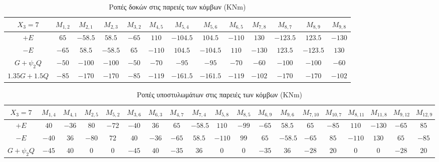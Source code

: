 \begin{landscape}

\begin{table}[h]
\centering\footnotesize
\begin{tabular}{| c || c | c | c | c | c | c | c | c | c | c | c | c |}
\hline
$X_3 = 7$ & $M_{1,2}$ & $M_{2,1}$ & $M_{2,3}$ & $M_{3,2}$ & $M_{4,5}$ & $M_{5,4}$ & $M_{5,6}$ & $M_{6,5}$ & $M_{7,8}$ & $M_{8,7}$ & $M_{8,9}$ & $M_{9,8}$ \\
\hline
\hline
$+E$ & $65$ & $-58.5$ & $58.5$ & $-65$ & $110$ & $-104.5$ & $104.5$ & $-110$ & $130$ & $-123.5$ & $123.5$ & $-130$ \\
\hline
$-E$ & $-65$ & $58.5$ & $-58.5$ & $65$ & $-110$ & $104.5$ & $-104.5$ & $110$ & $-130$ & $123.5$ & $-123.5$ & $130$ \\
\hline
$G+\psi_2 Q$ & $-50$ & $-100$ & $-100$ & $-50$ & $-70$ & $-95$ & $-95$ & $-70$ & $-60$ & $-100$ & $-100$ & $-60$ \\
\hline
$1.35G+1.5Q$ & $-85$ & $-170$ & $-170$ & $-85$ & $-119$ & $-161.5$ & $-161.5$ & $-119$ & $-102$ & $-170$ & $-170$ & $-102$ \\
\hline
\end{tabular}
\caption{Ροπές δοκών στις παρειές των κόμβων (\textlatin{KNm})}
\label{tab:momentbeams}
\end{table}

\begin{table}[h]
\centering\footnotesize
\begin{tabular}{| c || c | c | c | c | c | c | c | c | c | c | c | c | c | c | c | c | c | c |}
\hline
$X_3 = 7$ & $M_{1,4}$ & $M_{4,1}$ & $M_{2,5}$ & $M_{5,2}$ & $M_{3,6}$ & $M_{6,3}$ & $M_{4,7}$ & $M_{7,4}$ & $M_{5,8}$ & $M_{8,5}$ & $M_{6,9}$ & $M_{9,6}$ & $M_{7,10}$ & $M_{10,7}$ & $M_{8,11}$ & $M_{11,8}$ & $M_{9,12}$ & $M_{12,9}$ \\
\hline
\hline
$+E$ & $40$ & $-36$ & $80$ & $-72$ & $-40$ & $36$ & $65$ & $-58.5$ & $110$ & $-99$ & $-65$ & $58.5$ & $65$ & $-85$ & $110$ & $-130$ & $-65$ & $85$ \\
\hline
$-E$ & $-40$ & $36$ & $-80$ & $72$ & $40$ & $-36$ & $-65$ & $58.5$ & $-110$ & $99$ & $65$ & $-58.5$ & $-65$ & $85$ & $-110$ & $130$ & $65$ & $-85$ \\
\hline
$G+\psi_2 Q$ & $-45$ & $40$ & $0$ & $0$ & $-45$ & $40$ & $-35$ & $36$ & $0$ & $0$ & $-35$ & $36$ & $-28$ & $20$ & $0$ & $0$ & $-28$ & $20$ \\
\hline
\end{tabular}
\caption{Ροπές υποστυλωμάτων στις παρειές των κόμβων (\textlatin{KNm})}
\label{tab:momentcolumns}
\end{table}


\end{landscape}
